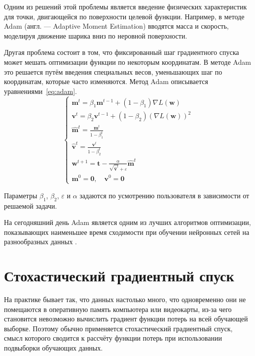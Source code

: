 Одним из решений этой проблемы является введение физических характеристик для точки, двигающейся по поверхности целевой функции. Например, в методе Adam (англ. --- Adaptive Moment Estimation) вводятся масса и скорость, моделируя движение шарика вниз по неровной поверхности.

Другая проблема состоит в том, что фиксированный шаг градиентного спуска может мешать оптимизации функции по некоторым координатам. В методе Adam это решается путём введения специальных весов, уменьшающих шаг по координатам, которые часто изменяются. Метод Adam описывается уравнениями \ref*{eq:adam}.
\begin{equation}
    \label{eq:adam}
    \begin{cases}
        \mathbf{m}^t=\beta_1\mathbf{m}^{t-1}+(1-\beta_1)\nabla L(\mathbf{w}) \\
        \mathbf{v}^t=\beta_2\mathbf{v}^{t-1}+(1-\beta_2)(\nabla L(\mathbf{w}))^2 \\
        \hat{\mathbf{m}}^t=\frac{\mathbf{m}^t}{1-\beta_1^t} \\
        \hat{\mathbf{v}}^t=\frac{\mathbf{v}^t}{1-\beta_2^t} \\
        \mathbf{w}^{t+1}=\mathbf{t}-\frac{\alpha}{\sqrt{\hat{\mathbf{v}}^t}+\varepsilon}\hat{\mathbf{m}}^t \\
        \mathbf{m}^0=\mathbf{0},\quad\mathbf{v}^0=\mathbf{0}
    \end{cases}
\end{equation}

Параметры $\beta_1$, $\beta_2$, $\varepsilon$ и $\alpha$ задаются по усмотрению пользователя в зависимости от решаемой задачи.

На сегодняшний день Adam является одним из лучших алгоритмов оптимизации, показывающих наименьшее время сходимости при обучении нейронных сетей на разнообразных данных \cite{art:optimizers}.

\section{Стохастический градиентный спуск}

На практике бывает так, что данных настолько много, что одновременно они не помещаются в оперативную память компьютера или видеокарты, из-за чего становится невозможно вычислить градиент функции потерь на всей обучающей выборке. Поэтому обычно применяется стохастический градиентный спуск, смысл которого сводится к рассчёту функции потерь при использовании подвыборки обучающих данных.

